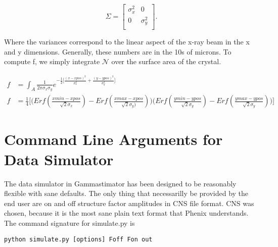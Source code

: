 \documentclass{report}
\begin{document}
\begin{equation}
\Sigma = 
\begin{bmatrix}
    \sigma_x^2 & 0 \\
    0 & \sigma_y^2 \\
\end{bmatrix}.
\end{equation}

Where the variances correspond to the linear aspect of the x-ray beam in the x and y dimensions. Generally, these numbers are in the 10s of microns. 
To compute f, we simply integrate $\mathcal{N}$ over the surface area of the crystal. 

\begin{equation}
\begin{aligned}
f &= \int_A \frac {1} {2\pi \sigma_x \sigma_y} e^{-\frac {1} {2} \big[ \frac {(x - xpos)^2}{\sigma_x^2} + \frac {(y - ypos)^2}{\sigma_y^2} \big]} \\
f &= \frac {1} {4} \bigg[ \bigg( Erf (\frac {xmin - xpos} {\sqrt {2} \sigma_x}) - Erf (\frac {xmax - xpos} {\sqrt {2} \sigma_y)} )\bigg)   \bigg( Erf ( \frac {ymin - ypos} {\sqrt {2} \sigma_y}) - Erf (\frac {ymax - ypos} {\sqrt {2} \sigma_y}) \bigg)  \bigg]
\end{aligned}
\end{equation}

\section{Command Line Arguments for Data Simulator}
The data simulator in Gammastimator has been designed to be reasonably flexible with sane defaults. 
The only thing that necessarilly be provided by the end user are on and off structure factor amplitudes in CNS file format.
CNS was chosen, because it is the most sane plain text format that Phenix understands. 
The command signature for simulate.py is

\begin{lstlisting}
python simulate.py [options] Foff Fon out
\end{lstlisting}



\end{document}
